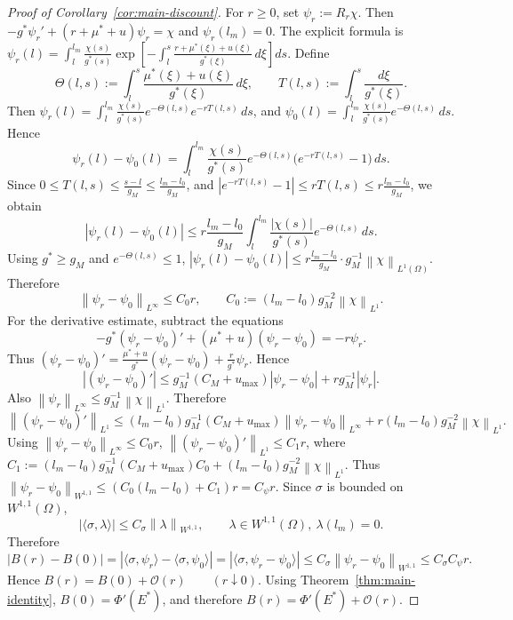 \documentclass[pdflatex,sn-mathphys-num]{sn-jnl}
\theoremstyle{thmstyleone}
\theoremstyle{definition}
\theoremstyle{remark}
\newcommand{\Om}{\Omega}
\newcommand{\norm}[1]{\left\lVert#1\right\rVert}
\newcommand{\abs}[1]{\left\lvert#1\right\rvert}
\numberwithin{equation}{section}
\begin{document}
\begin{proof}[Proof of Corollary~\ref{cor:main-discount}]
For \(r\ge0\), set
$\displaystyle 
\psi_r:=R_r\chi$.
Then
$\displaystyle 
-g^*\psi_r'
+
(r+\mu^*+u)\psi_r
=
\chi$ and
$\psi_r(l_m)=0$.
The explicit formula is
$\displaystyle 
\psi_r(l)
=
\int_l^{l_m}
\frac{\chi(s)}{g^*(s)}
\exp\!\left[
-\int_l^s
\frac{r+\mu^*(\xi)+u(\xi)}{g^*(\xi)}\,d\xi
\right]ds$.
Define
\[
\Theta(l,s):=\int_l^s\frac{\mu^*(\xi)+u(\xi)}{g^*(\xi)}\,d\xi,
\qquad
T(l,s):=\int_l^s\frac{d\xi}{g^*(\xi)}.
\]
Then
$\displaystyle 
\psi_r(l)
=
\int_l^{l_m}
\frac{\chi(s)}{g^*(s)}
e^{-\Theta(l,s)}
e^{-rT(l,s)}
\,ds$,
and
$\displaystyle 
\psi_0(l)
=
\int_l^{l_m}
\frac{\chi(s)}{g^*(s)}
e^{-\Theta(l,s)}
\,ds$.
Hence
\[
\psi_r(l)-\psi_0(l)
=
\int_l^{l_m}
\frac{\chi(s)}{g^*(s)}
e^{-\Theta(l,s)}
\big(e^{-rT(l,s)}-1\big)
\,ds.
\]
Since
$\displaystyle 
0\le T(l,s)\le\frac{s-l}{g_M}\le\frac{l_m-l_0}{g_M}$,
and
$\displaystyle 
\abs{e^{-rT(l,s)}-1}
\le rT(l,s)
\le
r\frac{l_m-l_0}{g_M}$,
we obtain
\[ 
\abs{\psi_r(l)-\psi_0(l)}
\le
r\frac{l_m-l_0}{g_M}
\int_l^{l_m}
\frac{\abs{\chi(s)}}{g^*(s)}
e^{-\Theta(l,s)}\,ds.
\]
Using \(g^*\ge g_M\) and \(e^{-\Theta(l,s)}\le1\),
$\displaystyle 
\abs{\psi_r(l)-\psi_0(l)}
\le
r\frac{l_m-l_0}{g_M}
\cdot
g_M^{-1}\norm{\chi}_{L^1(\Om)}$.
Therefore
\[
\norm{\psi_r-\psi_0}_{L^\infty}
\le
C_0r,
\qquad
C_0:=
(l_m-l_0)g_M^{-2}\norm{\chi}_{L^1}.
\]
For the derivative estimate, subtract the equations
\[
-g^*(\psi_r-\psi_0)'
+
(\mu^*+u)(\psi_r-\psi_0)
=
-r\psi_r.
\]
Thus
$\displaystyle 
(\psi_r-\psi_0)'
=
\frac{\mu^*+u}{g^*}(\psi_r-\psi_0)
+
\frac{r}{g^*}\psi_r$.
Hence
\[
\abs{(\psi_r-\psi_0)'}
\le
g_M^{-1}(C_M+u_{\max})\abs{\psi_r-\psi_0}
+
rg_M^{-1}\abs{\psi_r}.
\]
Also
$\displaystyle 
\norm{\psi_r}_{L^\infty}
\le
g_M^{-1}\norm{\chi}_{L^1}$.
Therefore
\[
\norm{(\psi_r-\psi_0)'}_{L^1}
\le
(l_m-l_0)g_M^{-1}(C_M+u_{\max})\norm{\psi_r-\psi_0}_{L^\infty}
+
r(l_m-l_0)g_M^{-2}\norm{\chi}_{L^1}.
\]
Using \(\norm{\psi_r-\psi_0}_{L^\infty}\le C_0r\),
$\displaystyle 
\norm{(\psi_r-\psi_0)'}_{L^1}
\le
C_1r$,
where
$\displaystyle 
C_1:=
(l_m-l_0)g_M^{-1}(C_M+u_{\max})C_0
+
(l_m-l_0)g_M^{-2}\norm{\chi}_{L^1}$.
Thus
$\displaystyle 
\norm{\psi_r-\psi_0}_{W^{1,1}}
\le
(C_0(l_m-l_0)+C_1)r
=
C_\psi r$.
Since \(\sigma\) is bounded on \(W^{1,1}(\Om)\),
\[
\abs{\langle\sigma,\lambda\rangle}
\le C_\sigma\norm{\lambda}_{W^{1,1}},
\qquad
\lambda\in W^{1,1}(\Om),\ \lambda(l_m)=0.
\]
Therefore
\[
\abs{B(r)-B(0)}
=
\abs{\langle\sigma,\psi_r\rangle-\langle\sigma,\psi_0\rangle}
=
\abs{\langle\sigma,\psi_r-\psi_0\rangle}
\le
C_\sigma\norm{\psi_r-\psi_0}_{W^{1,1}}
\le
C_\sigma C_\psi r .
\]
Hence
$\displaystyle 
B(r)=B(0)+\mathcal O(r)
\qquad(r\downarrow0)$.
Using Theorem~\ref{thm:main-identity},
$\displaystyle 
B(0)=\Phi'(E^*)$,
and therefore
$\displaystyle 
B(r)=\Phi'(E^*)+\mathcal O(r)$.
\end{proof}
\end{document}

